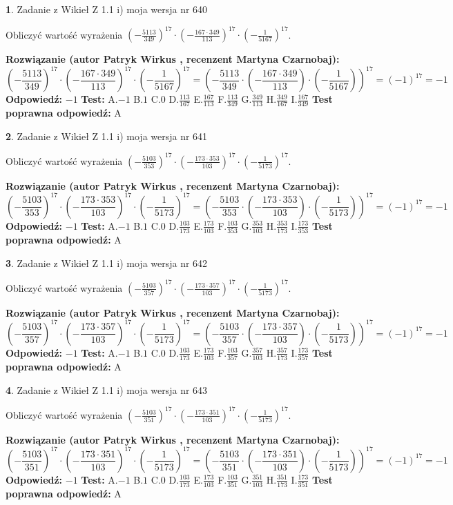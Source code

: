 \documentclass[12pt, a4paper]{article}
\theoremstyle{definition} %
\newtheorem{zad}{}
\newcommand{\zadStart}[1]{\begin{zad}#1\newline}
\newcommand{\zadStop}{\end{zad}}
\newcommand{\rozwStart}[2]{\noindent \textbf{Rozwiązanie (autor #1 , recenzent #2): }\newline}
\newcommand{\rozwStop}{\newline}
\newcommand{\odpStart}{\noindent \textbf{Odpowiedź:}\newline}
\newcommand{\odpStop}{\newline}
\newcommand{\testStart}{\noindent \textbf{Test:}\newline}
\newcommand{\testStop}{\newline}
\newcommand{\kluczStart}{\noindent \textbf{Test poprawna odpowiedź:}\newline}
\newcommand{\kluczStop}{\newline}
\begin{document}
\zadStart{Zadanie z Wikieł Z 1.1 i) moja wersja nr 640}

Obliczyć wartość wyrażenia $(-\frac{5113}{349})^{17} \cdot (-\frac{167 \cdot 349}{113})^{17} \cdot (-\frac{1}{5167})^{17}$.
\zadStop
\rozwStart{Patryk Wirkus}{Martyna Czarnobaj}
$$(-\frac{5113}{349})^{17} \cdot (-\frac{167 \cdot 349}{113})^{17} \cdot (-\frac{1}{5167})^{17} = (-\frac{5113}{349} \cdot (-\frac{167 \cdot 349}{113}) \cdot (-\frac{1}{5167}))^{17} = (-1)^{17} = -1$$
\rozwStop
\odpStart
$-1$
\odpStop
\testStart
A.$-1$ B.$1$ C.$0$ D.$\frac{113}{167}$ E.$\frac{167}{113}$
F.$\frac{113}{349}$ G.$\frac{349}{113}$
H.$\frac{349}{167}$
I.$\frac{167}{349}$
\testStop
\kluczStart
A
\kluczStop



\zadStart{Zadanie z Wikieł Z 1.1 i) moja wersja nr 641}

Obliczyć wartość wyrażenia $(-\frac{5103}{353})^{17} \cdot (-\frac{173 \cdot 353}{103})^{17} \cdot (-\frac{1}{5173})^{17}$.
\zadStop
\rozwStart{Patryk Wirkus}{Martyna Czarnobaj}
$$(-\frac{5103}{353})^{17} \cdot (-\frac{173 \cdot 353}{103})^{17} \cdot (-\frac{1}{5173})^{17} = (-\frac{5103}{353} \cdot (-\frac{173 \cdot 353}{103}) \cdot (-\frac{1}{5173}))^{17} = (-1)^{17} = -1$$
\rozwStop
\odpStart
$-1$
\odpStop
\testStart
A.$-1$ B.$1$ C.$0$ D.$\frac{103}{173}$ E.$\frac{173}{103}$
F.$\frac{103}{353}$ G.$\frac{353}{103}$
H.$\frac{353}{173}$
I.$\frac{173}{353}$
\testStop
\kluczStart
A
\kluczStop



\zadStart{Zadanie z Wikieł Z 1.1 i) moja wersja nr 642}

Obliczyć wartość wyrażenia $(-\frac{5103}{357})^{17} \cdot (-\frac{173 \cdot 357}{103})^{17} \cdot (-\frac{1}{5173})^{17}$.
\zadStop
\rozwStart{Patryk Wirkus}{Martyna Czarnobaj}
$$(-\frac{5103}{357})^{17} \cdot (-\frac{173 \cdot 357}{103})^{17} \cdot (-\frac{1}{5173})^{17} = (-\frac{5103}{357} \cdot (-\frac{173 \cdot 357}{103}) \cdot (-\frac{1}{5173}))^{17} = (-1)^{17} = -1$$
\rozwStop
\odpStart
$-1$
\odpStop
\testStart
A.$-1$ B.$1$ C.$0$ D.$\frac{103}{173}$ E.$\frac{173}{103}$
F.$\frac{103}{357}$ G.$\frac{357}{103}$
H.$\frac{357}{173}$
I.$\frac{173}{357}$
\testStop
\kluczStart
A
\kluczStop



\zadStart{Zadanie z Wikieł Z 1.1 i) moja wersja nr 643}

Obliczyć wartość wyrażenia $(-\frac{5103}{351})^{17} \cdot (-\frac{173 \cdot 351}{103})^{17} \cdot (-\frac{1}{5173})^{17}$.
\zadStop
\rozwStart{Patryk Wirkus}{Martyna Czarnobaj}
$$(-\frac{5103}{351})^{17} \cdot (-\frac{173 \cdot 351}{103})^{17} \cdot (-\frac{1}{5173})^{17} = (-\frac{5103}{351} \cdot (-\frac{173 \cdot 351}{103}) \cdot (-\frac{1}{5173}))^{17} = (-1)^{17} = -1$$
\rozwStop
\odpStart
$-1$
\odpStop
\testStart
A.$-1$ B.$1$ C.$0$ D.$\frac{103}{173}$ E.$\frac{173}{103}$
F.$\frac{103}{351}$ G.$\frac{351}{103}$
H.$\frac{351}{173}$
I.$\frac{173}{351}$
\testStop
\kluczStart
A
\kluczStop
\end{document}
